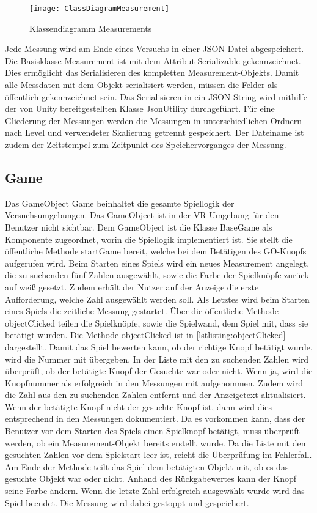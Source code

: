 \begin{figure}[!htbp]
	\centering
	\texttt{[image: ClassDiagramMeasurement]}
	\caption[Klassendiagramm Measurements]{Klassendiagramm Measurements}
	\label{fig:ClassDiagramMeasurement}
\end{figure}

Jede Messung wird am Ende eines Versuchs in einer JSON-Datei abgespeichert. Die Basisklasse Measurement ist mit dem Attribut Serializable gekennzeichnet. Dies ermöglicht das Serialisieren des kompletten Measurement-Objekts. Damit alle Messdaten mit dem Objekt serialisiert werden, müssen die Felder als öffentlich gekennzeichnet sein. Das Serialisieren in ein JSON-String wird mithilfe der von Unity bereitgestellten Klasse {\ttfamily JsonUtility} durchgeführt. Für eine Gliederung der Messungen werden die Messungen in unterschiedlichen Ordnern nach Level und verwendeter Skalierung getrennt gespeichert. Der Dateiname ist zudem der Zeitstempel zum Zeitpunkt des Speichervorganges der Messung.

\subsection{Game}
\label{section:game}
Das GameObject {\ttfamily Game} beinhaltet die gesamte Spiellogik der Versuchsumgebungen. Das GameObject ist in der \ac{VR}-Umgebung für den Benutzer nicht sichtbar. Dem GameObject ist die Klasse {\ttfamily BaseGame} als Komponente zugeordnet, worin die Spiellogik implementiert ist. Sie stellt die öffentliche Methode {\ttfamily startGame} bereit, welche bei dem Betätigen des GO-Knopfs aufgerufen wird. Beim Starten eines Spiels wird ein neues Measurement angelegt, die zu suchenden fünf Zahlen ausgewählt, sowie die Farbe der Spielknöpfe zurück auf weiß gesetzt. Zudem erhält der Nutzer auf der Anzeige die erste Aufforderung, welche Zahl ausgewählt werden soll. Als Letztes wird beim Starten eines Spiels die zeitliche Messung gestartet. Über die öffentliche Methode {\ttfamily objectClicked} teilen die Spielknöpfe, sowie die Spielwand, dem Spiel mit, dass sie betätigt wurden. Die Methode {\ttfamily objectClicked} ist in \autoref{lstlisting:objectClicked} dargestellt. Damit das Spiel bewerten kann, ob der richtige Knopf betätigt wurde, wird die Nummer mit übergeben. In der Liste mit den zu suchenden Zahlen wird überprüft, ob der betätigte Knopf der Gesuchte war oder nicht. Wenn ja, wird die Knopfnummer als erfolgreich in den Messungen mit aufgenommen. Zudem wird die Zahl aus den zu suchenden Zahlen entfernt und der Anzeigetext aktualisiert. Wenn der betätigte Knopf nicht der gesuchte Knopf ist, dann wird dies entsprechend in den Messungen dokumentiert. Da es vorkommen kann, dass der Benutzer vor dem Starten des Spiels einen Spielknopf betätigt, muss überprüft werden, ob ein Measurement-Objekt bereits erstellt wurde. Da die Liste mit den gesuchten Zahlen vor dem Spielstart leer ist, reicht die Überprüfung im Fehlerfall. Am Ende der Methode teilt das Spiel dem betätigten Objekt mit, ob es das gesuchte Objekt war oder nicht. Anhand des Rückgabewertes kann der Knopf seine Farbe ändern. Wenn die letzte Zahl erfolgreich ausgewählt wurde wird das Spiel beendet. Die Messung wird dabei gestoppt und gespeichert.\\


